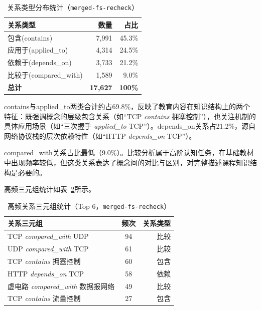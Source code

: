 \begin{table}[ht]
    \centering
    \caption{关系类型分布统计（\texttt{merged-fs-recheck}）}
    \label{tab:5-7}
    \begin{tabular}{lrr}
    \toprule
    \textbf{关系类型} & \textbf{数量} & \textbf{占比} \\
    \midrule
    包含(contains) & 7,991 & 45.3\% \\
    应用于(applied\_to) & 4,314 & 24.5\% \\
    依赖于(depends\_on) & 3,733 & 21.2\% \\
    比较于(compared\_with) & 1,589 & 9.0\% \\
    \midrule
    \textbf{总计} & \textbf{17,627} & \textbf{100\%} \\
    \bottomrule
    \end{tabular}
\end{table}

contains与applied\_to两类合计约占69.8\%，反映了教育内容在知识结构上的两个特征：既强调概念的层级包含关系（如“TCP \textit{contains} 拥塞控制”），也关注机制的具体应用场景（如“三次握手 \textit{applied\_to} TCP”）。depends\_on关系占21.2\%，源自网络协议栈的层次依赖特性（如“HTTP \textit{depends\_on} TCP”）。

compared\_with关系占比最低（9.0\%）。比较分析属于高阶认知任务，在基础教材中出现频率较低，但这类关系表达了概念间的对比与区别，对完整描述课程知识结构是必要的。

高频三元组统计如表~\ref{tab:5-8}所示。

\begin{table}[ht]
    \centering
    \caption{高频关系三元组统计（Top 6，\texttt{merged-fs-recheck}）}
    \label{tab:5-8}
    \begin{tabular}{lcr}
    \toprule
    \textbf{关系三元组} & \textbf{频次} & \textbf{关系类型} \\
    \midrule
    TCP \textit{compared\_with} UDP & 94 & 比较 \\
    UDP \textit{compared\_with} TCP & 61 & 比较 \\
    TCP \textit{contains} 拥塞控制 & 60 & 包含 \\
    HTTP \textit{depends\_on} TCP & 58 & 依赖 \\
    虚电路 \textit{compared\_with} 数据报网络 & 49 & 比较 \\
    TCP \textit{contains} 流量控制 & 27 & 包含 \\
    \bottomrule
    \end{tabular}
\end{table}

